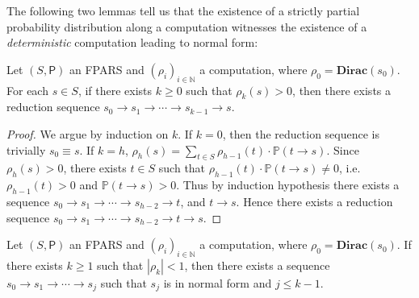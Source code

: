 The following two lemmas tell us that the existence of a strictly partial
probability distribution along a computation witnesses the existence
of a \emph{deterministic} computation leading to normal form:
\begin{lemma}\label{lemma:exseq}
	Let $(S, \mathsf{P})$ an FPARS and $(\rho_i)_{i\in\mathbb{N}}$ a
	computation, where $\rho_0=\mathbf{Dirac}(s_0)$. For each $s\in S$, if there
	exists $k\geq 0$ such that $\rho_k(s)>0$, then there exists a
	reduction sequence $s_0\rightarrow s_1\rightarrow\cdots\rightarrow
	s_{k-1}\rightarrow s$.
\end{lemma}
\begin{proof}
	We argue by induction on $k$. If $k=0$, then the reduction sequence is trivially $s_0\equiv s$. If $k=h$, $\rho_h(s)=\underset{t\in S}{\sum}\rho_{h-1}\left( t\right) \cdot\mathbb{P}\left(t \rightarrow s\right)$. Since $\rho_h(s)>0$, there exists $t\in S$ such that $\rho_{h-1}\left( t\right) \cdot\mathbb{P}\left(t \rightarrow s\right)\neq 0$, i.e. $\rho_{h-1}(t)>0$ and $\mathbb{P}\left(t \rightarrow s\right)>0$. Thus by induction hypothesis there exists a sequence $s_0\rightarrow s_1\rightarrow \cdots\rightarrow s_{h-2}\rightarrow t$, and $t \rightarrow s$. Hence there exists a reduction sequence $s_0\rightarrow s_1\rightarrow \cdots\rightarrow s_{h-2}\rightarrow t\rightarrow s$.
\end{proof}
\begin{lemma}\label{lemma:exseq2}
	Let $(S, \mathsf{P})$ an FPARS and $(\rho_i)_{i\in\mathbb{N}}$ a computation, where $\rho_0=\mathbf{Dirac}(s_0)$. If there exists $k\geq 1$ such that $|\rho_k|<1$, then there exists a sequence $s_0\rightarrow s_1\rightarrow\cdots\rightarrow s_{j}$ such that $s_{j}$ is in normal form and $j\leq k-1$.
\end{lemma}
